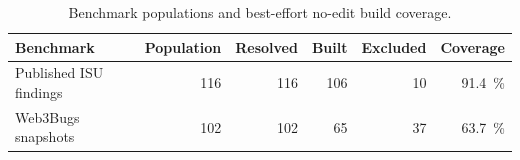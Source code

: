 \begin{table}
  \caption{Benchmark populations and best-effort no-edit build coverage.}
  \label{tab:benchmarks}
  \centering
  \small
  \begin{tabular}{lrrrrr}
    \toprule
    Benchmark & Population & Resolved & Built & Excluded & Coverage \\
    \midrule
    Published ISU findings & 116 & 116 & 106 & 10 & \SI{91.4}{\percent} \\
    Web3Bugs snapshots     & 102 & 102 &  65 & 37 & \SI{63.7}{\percent} \\
    \bottomrule
  \end{tabular}
\end{table}
